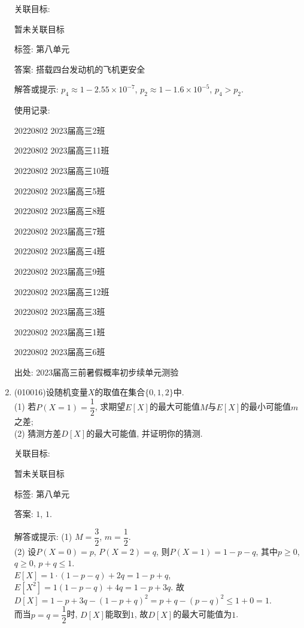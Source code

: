 \documentclass[10pt,a4paper]{article}
\begin{document}
\begin{enumerate}[1.]
关联目标:

暂未关联目标



标签: 第八单元

答案: 搭载四台发动机的飞机更安全

解答或提示: $p_4\approx 1-2.55\times 10^{-7}$, $p_2\approx 1-1.6\times 10^{-5}$, $p_4>p_2$.

使用记录:

20220802	2023届高三2班	

20220802	2023届高三11班	

20220802	2023届高三10班	

20220802	2023届高三5班	

20220802	2023届高三8班	

20220802	2023届高三7班	

20220802	2023届高三4班	

20220802	2023届高三9班	

20220802	2023届高三12班	

20220802	2023届高三3班	

20220802	2023届高三1班	

20220802	2023届高三6班	


出处: 2023届高三前暑假概率初步续单元测验
\item { (010016)}设随机变量$X$的取值在集合$\{0,1,2\}$中.\\
(1) 若$P(X=1)=\dfrac 12$, 求期望$E[X]$的最大可能值$M$与$E[X]$的最小可能值$m$之差;\\
(2) 猜测方差$D[X]$的最大可能值, 并证明你的猜测.


关联目标:

暂未关联目标



标签: 第八单元

答案: $1$, $1$.

解答或提示: (1) $M=\dfrac 32$, $m=\dfrac 12$.\\
(2) 设$P(X=0)=p$, $P(X=2)=q$, 则$P(X=1)=1-p-q$, 其中$p\ge 0$, $q\ge 0$, $p+q\le 1$.\\
$E[X]=1\cdot (1-p-q)+2q=1-p+q$, $E[X^2]=1(1-p-q)+4q=1-p+3q$. 故$D[X]=1-p+3q-(1-p+q)^2=p+q-(p-q)^2\le 1+0=1$.\\
而当$p=q=\dfrac 12$时, $D[X]$能取到$1$, 故$D[X]$的最大可能值为$1$.


\end{enumerate}
\end{document}

